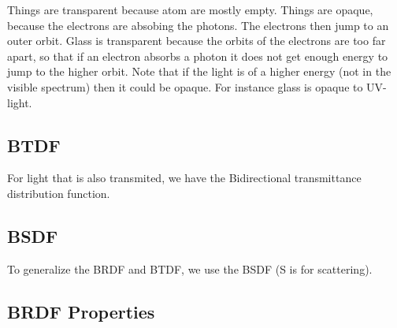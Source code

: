 \documentclass[10pt]{armath}
\numberwithin{equation}{section}
\newenvironment{Figure}
{\par\medskip\noindent\minipage{\linewidth}}
{\endminipage\par\medskip}
\theoremstyle{definition}
\begin{document}
\begin{multicols}{2}
  Things are transparent because atom are mostly empty. Things are opaque,
  because the electrons are absobing the photons. The electrons then jump to an
  outer orbit. Glass is transparent because the orbits of the electrons are too
  far apart, so that if an electron absorbs a photon it does not get enough
  energy to jump to the higher orbit. Note that if the light is of a higher
  energy (not in the visible spectrum) then it could be opaque. For instance
  glass is opaque to UV-light.

  \subsection{BTDF}%
  \label{sub:btdf}

  For light that is also transmited, we have the Bidirectional transmittance
  distribution function.

  \begin{Figure}
    \begin{center}
      
    \end{center}
    \label{fig:03_3}
  \end{Figure}

  \subsection{BSDF}%
  \label{sub:bsdf}

  To generalize the BRDF and BTDF, we use the BSDF (S is for scattering).

  \subsection{BRDF Properties}%
  \label{sub:brdf_properties}


\end{multicols}
\end{document}

